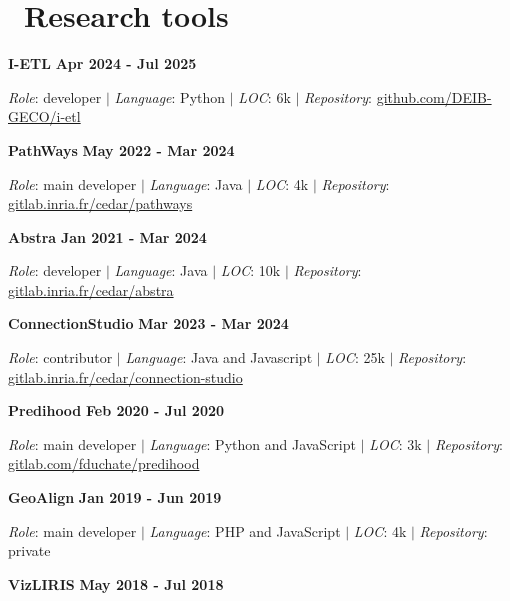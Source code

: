 \documentclass{article}
\begin{document}
\section*{\faCode\ Research tools}
\noindent\textbf{I-ETL} \hfill \textbf{Apr 2024 - Jul 2025}


\noindent\textit{Role}: developer $|$ \textit{Language}: Python $|$ \textit{LOC}: 6k $|$ \textit{Repository}: \href{https://github.com/DEIB-GECO/i-etl}{github.com/DEIB-GECO/i-etl}

\vspace{1em}\noindent\textbf{PathWays} \hfill \textbf{May 2022 - Mar 2024}


\noindent\textit{Role}: main developer $|$ \textit{Language}: Java $|$ \textit{LOC}: 4k $|$ \textit{Repository}: \href{https://gitlab.inria.fr/cedar/pathways}{gitlab.inria.fr/cedar/pathways}

\vspace{1em}\noindent\textbf{Abstra} \hfill \textbf{Jan 2021 - Mar 2024}


\noindent\textit{Role}: developer $|$ \textit{Language}: Java $|$ \textit{LOC}: 10k $|$ \textit{Repository}: \href{https://gitlab.inria.fr/cedar/abstra}{gitlab.inria.fr/cedar/abstra}

\vspace{1em}\noindent\textbf{ConnectionStudio} \hfill \textbf{Mar 2023 - Mar 2024}


\noindent\textit{Role}: contributor $|$ \textit{Language}: Java and Javascript $|$ \textit{LOC}: 25k $|$ \textit{Repository}: \href{https://gitlab.inria.fr/cedar/connection-studio}{gitlab.inria.fr/cedar/connection-studio}

\vspace{1em}\noindent\textbf{Predihood} \hfill \textbf{Feb 2020 - Jul 2020}


\noindent\textit{Role}: main developer $|$ \textit{Language}: Python and JavaScript $|$ \textit{LOC}: 3k $|$ \textit{Repository}: \href{https://gitlab.com/fduchate/predihood}{gitlab.com/fduchate/predihood}

\vspace{1em}\noindent\textbf{GeoAlign} \hfill \textbf{Jan 2019 - Jun 2019}


\noindent\textit{Role}: main developer $|$ \textit{Language}: PHP and JavaScript $|$ \textit{LOC}: 4k $|$ \textit{Repository}: private

\vspace{1em}\noindent\textbf{VizLIRIS} \hfill \textbf{May 2018 - Jul 2018}
\end{document}
